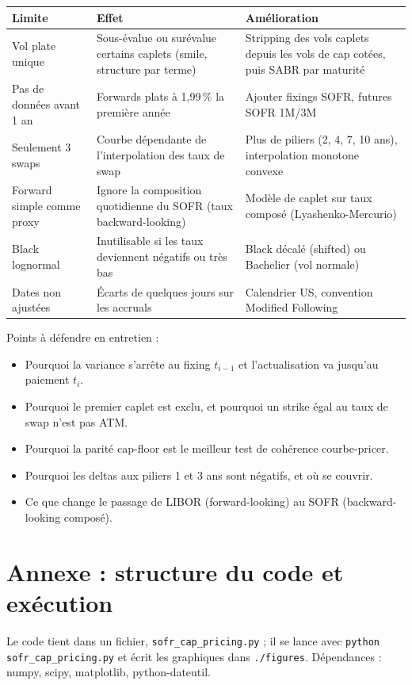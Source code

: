 \documentclass[11pt,a4paper]{article}
\begin{document}
\begin{table}[H]
\centering
\small
\begin{tabularx}{\textwidth}{>{\raggedright\arraybackslash}p{3.2cm}YY}
\toprule
Limite & Effet & Amélioration \\
\midrule
Vol plate unique & Sous-évalue ou surévalue certains caplets (smile, structure par terme) & Stripping des vols caplets depuis les vols de cap cotées, puis SABR par maturité \\
Pas de données avant 1 an & Forwards plats à 1,99\,\% la première année & Ajouter fixings SOFR, futures SOFR 1M/3M \\
Seulement 3 swaps & Courbe dépendante de l'interpolation des taux de swap & Plus de piliers (2, 4, 7, 10 ans), interpolation monotone convexe \\
Forward simple comme proxy & Ignore la composition quotidienne du SOFR (taux backward-looking) & Modèle de caplet sur taux composé (Lyashenko-Mercurio) \\
Black lognormal & Inutilisable si les taux deviennent négatifs ou très bas & Black décalé (shifted) ou Bachelier (vol normale) \\
Dates non ajustées & Écarts de quelques jours sur les accruals & Calendrier US, convention Modified Following \\
\bottomrule
\end{tabularx}
\end{table}

Points à défendre en entretien :
\begin{itemize}[nosep]
  \item Pourquoi la variance s'arrête au fixing $t_{i-1}$ et l'actualisation va jusqu'au paiement $t_i$.
  \item Pourquoi le premier caplet est exclu, et pourquoi un strike égal au taux de swap n'est pas ATM.
  \item Pourquoi la parité cap-floor est le meilleur test de cohérence courbe-pricer.
  \item Pourquoi les deltas aux piliers 1 et 3 ans sont négatifs, et où se couvrir.
  \item Ce que change le passage de LIBOR (forward-looking) au SOFR (backward-looking composé).
\end{itemize}

\appendix
\section{Annexe : structure du code et exécution}
Le code tient dans un fichier, \texttt{sofr\_cap\_pricing.py} ; il se lance avec \texttt{python sofr\_cap\_pricing.py} et écrit les graphiques dans \texttt{./figures}. Dépendances : numpy, scipy, matplotlib, python-dateutil.
\end{document}

